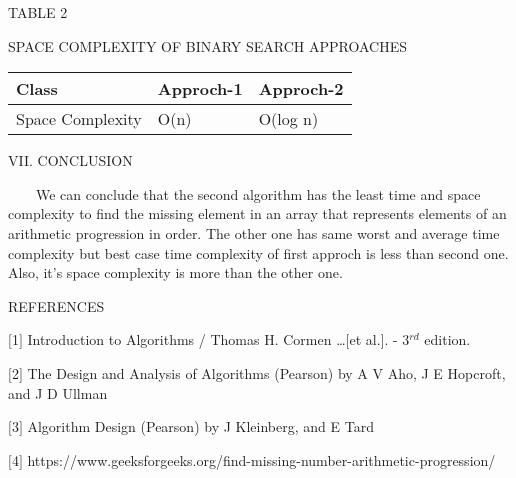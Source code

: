 \documentclass[12pt,a4paper]{article}
\begin{document}
\begin{center}TABLE 2\end{center}

\begin{center}SPACE COMPLEXITY OF  BINARY SEARCH APPROACHES\end{center}

\begin{table}[h]
\centering
\begin{tabular}{|l|l|l|}
\hline
\textbf{Class} & \textbf{Approch-1} & \textbf{Approch-2} \\
\hline
Space Complexity & O(n) & O(log n) \\
\hline
\end{tabular}
\end{table}

\begin{multicols}{2}





\begin{center}VII. CONCLUSION\end{center}

\ \ \ \ We can conclude that the second algorithm has the least time and space 
complexity to find the missing element in an array that represents elements of an arithmetic progression in order. 
The other one has same worst and average time complexity but best case time complexity of first approch is less than second one. Also,  it's space complexity is more than the other one.


\begin{center}REFERENCES\end{center}

$[$1$]$ Introduction to Algorithms / Thomas H. Cormen \ldots $[$et 
al.$]$. - 3$^{rd}$ edition.

$[$2$]$ The Design and Analysis of Algorithms (Pearson) by A V Aho, J E 
Hopcroft, and J D Ullman 

$[$3$]$ Algorithm Design (Pearson) by J Kleinberg, and E Tard

$[$4$]$ https://www.geeksforgeeks.org/find-missing-number-arithmetic-progression/

\end{multicols}
\end{document}
